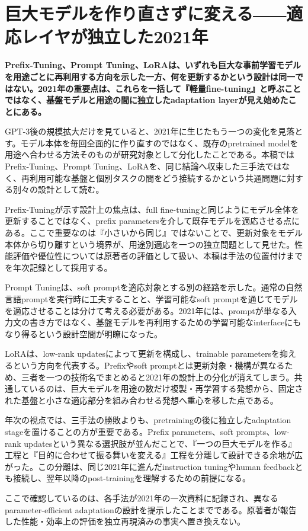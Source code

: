 \section{巨大モデルを作り直さずに変える――適応レイヤが独立した2021年}
\noindent\textbf{Prefix-Tuning、Prompt Tuning、LoRAは、いずれも巨大な事前学習モデルを用途ごとに再利用する方向を示した一方、何を更新するかという設計は同一ではない。2021年の重要点は、これらを一括して『軽量fine-tuning』と呼ぶことではなく、基盤モデルと用途の間に独立したadaptation layerが見え始めたことにある。}\autocite{src-ab9d63ddee6e,src-c1ad400391c9,src-dba095cd4e62}

GPT-3後の規模拡大だけを見ていると、2021年に生じたもう一つの変化を見落とす。モデル本体を毎回全面的に作り直すのではなく、既存のpretrained modelを用途へ合わせる方法そのものが研究対象として分化したことである。本稿ではPrefix-Tuning、Prompt Tuning、LoRAを、同じ結論へ収束した三手法ではなく、再利用可能な基盤と個別タスクの間をどう接続するかという共通問題に対する別々の設計として読む。\autocite{src-ab9d63ddee6e,src-c1ad400391c9,src-dba095cd4e62}


Prefix-Tuningが示す設計上の焦点は、full fine-tuningと同じようにモデル全体を更新することではなく、prefix parametersを介して既存モデルを適応させる点にある。ここで重要なのは『小さいから同じ』ではないことで、更新対象をモデル本体から切り離すという境界が、用途別適応を一つの独立問題として見せた。性能評価や優位性については原著者の評価として扱い、本稿は手法の位置付けまでを年次記録として採用する。\autocite{src-dba095cd4e62}


Prompt Tuningは、soft promptを適応対象とする別の経路を示した。通常の自然言語promptを実行時に工夫することと、学習可能なsoft promptを通じてモデルを適応させることは分けて考える必要がある。2021年には、promptが単なる入力文の書き方ではなく、基盤モデルを再利用するための学習可能なinterfaceにもなり得るという設計空間が明瞭になった。\autocite{src-c1ad400391c9}


LoRAは、low-rank updatesによって更新を構成し、trainable parametersを抑えるという方向を代表する。Prefixやsoft promptとは更新対象・機構が異なるため、三者を一つの技術名でまとめると2021年の設計上の分化が消えてしまう。共通しているのは、巨大モデルを用途の数だけ複製・再学習する発想から、固定された基盤と小さな適応部分を組み合わせる発想へ重心を移した点である。\autocite{src-ab9d63ddee6e}


年次の視点では、三手法の勝敗よりも、pretrainingの後に独立したadaptation stageを置けることの方が重要である。Prefix parameters、soft prompts、low-rank updatesという異なる選択肢が並んだことで、『一つの巨大モデルを作る』工程と『目的に合わせて振る舞いを変える』工程を分離して設計できる余地が広がった。この分離は、同じ2021年に進んだinstruction tuningやhuman feedbackとも接続し、翌年以降のpost-trainingを理解するための前提になる。\autocite{src-ab9d63ddee6e,src-c1ad400391c9,src-dba095cd4e62}


\begin{claimboundary}
ここで確認しているのは、各手法が2021年の一次資料に記録され、異なるparameter-efficient adaptationの設計を提示したことまでである。原著者が報告した性能・効率上の評価を独立再現済みの事実へ置き換えない。\autocite{src-ab9d63ddee6e,src-c1ad400391c9,src-dba095cd4e62}
\end{claimboundary}

